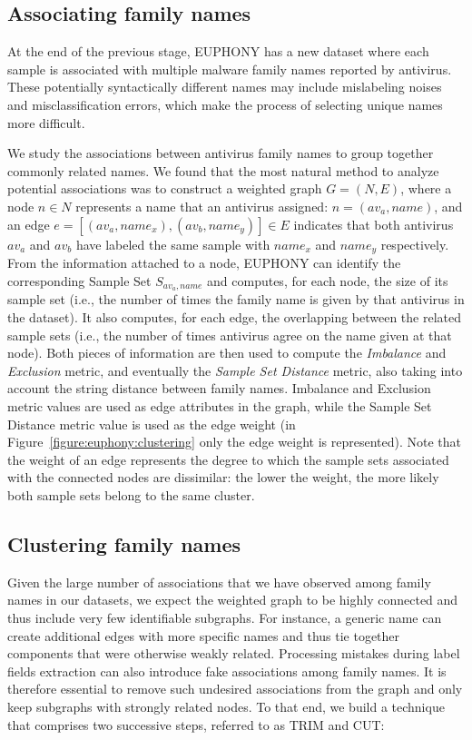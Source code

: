 \subsection{Associating family names}
At the end of the previous stage, EUPHONY has a new dataset where each sample is associated with multiple malware family names reported by antivirus.
These potentially syntactically different names may include mislabeling noises and misclassification errors, which make the process of selecting unique names more difficult.

We study the associations between antivirus family names to group together commonly related names.
We found that the most natural method to analyze potential associations was to construct a weighted graph $G = (N, E)$, where a node $n \in N$ represents a name that an antivirus assigned: $n = (av_a, name)$, and an edge $e = [(av_a, name_x), (av_b, name_y)] \in E$ indicates that both antivirus $av_a$ and $av_b$ have labeled the same sample with $name_x$ and $name_y$ respectively.
From the information attached to a node, EUPHONY can identify the corresponding Sample Set $S_{av_a,name}$ and computes, for each node, the size of its sample set (i.e., the number of times the family name is given by that antivirus in the dataset).
It also computes, for each edge, the overlapping between the related sample sets (i.e., the number of times antivirus agree on the name given at that node).
Both pieces of information are then used to compute the {\em Imbalance} and {\em Exclusion} metric, and eventually the {\em Sample Set Distance} metric, also taking into account the string distance between family names.
Imbalance and Exclusion metric values are used as edge attributes in the graph, while the Sample Set Distance metric value is used as the edge weight (in Figure~\ref{figure:euphony:clustering} only the edge weight is represented).
Note that the weight of an edge represents the degree to which the sample sets associated with the connected nodes are dissimilar: the lower the weight, the more likely both sample sets belong to the same cluster.
\subsection{Clustering family names}
Given the large number of associations that we have observed among family names in our datasets, we expect the weighted graph to be highly connected and thus include very few identifiable subgraphs.
For instance, a generic name can create additional edges with more specific names and thus tie together components that were otherwise weakly related.
Processing mistakes during label fields extraction can also introduce fake associations among family names.
It is therefore essential to remove such undesired associations from the graph and only keep subgraphs with strongly related nodes.
To that end, we build a technique that comprises two successive steps, referred to as TRIM and CUT:

